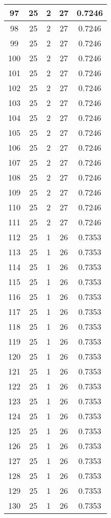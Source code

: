 \documentclass[letterpaper, 12pt]{article}
\begin{document}
\begin{longtable}{|c|c|c|c|c|}
\hline
97 & 25 & 2 & 27 & 0.7246 \\
\hline
98 & 25 & 2 & 27 & 0.7246 \\
\hline
99 & 25 & 2 & 27 & 0.7246 \\
\hline
100 & 25 & 2 & 27 & 0.7246 \\
\hline
101 & 25 & 2 & 27 & 0.7246 \\
\hline
102 & 25 & 2 & 27 & 0.7246 \\
\hline
103 & 25 & 2 & 27 & 0.7246 \\
\hline
104 & 25 & 2 & 27 & 0.7246 \\
\hline
105 & 25 & 2 & 27 & 0.7246 \\
\hline
106 & 25 & 2 & 27 & 0.7246 \\
\hline
107 & 25 & 2 & 27 & 0.7246 \\
\hline
108 & 25 & 2 & 27 & 0.7246 \\
\hline
109 & 25 & 2 & 27 & 0.7246 \\
\hline
110 & 25 & 2 & 27 & 0.7246 \\
\hline
111 & 25 & 2 & 27 & 0.7246 \\
\hline
112 & 25 & 1 & 26 & 0.7353 \\
\hline
113 & 25 & 1 & 26 & 0.7353 \\
\hline
114 & 25 & 1 & 26 & 0.7353 \\
\hline
115 & 25 & 1 & 26 & 0.7353 \\
\hline
116 & 25 & 1 & 26 & 0.7353 \\
\hline
117 & 25 & 1 & 26 & 0.7353 \\
\hline
118 & 25 & 1 & 26 & 0.7353 \\
\hline
119 & 25 & 1 & 26 & 0.7353 \\
\hline
120 & 25 & 1 & 26 & 0.7353 \\
\hline
121 & 25 & 1 & 26 & 0.7353 \\
\hline
122 & 25 & 1 & 26 & 0.7353 \\
\hline
123 & 25 & 1 & 26 & 0.7353 \\
\hline
124 & 25 & 1 & 26 & 0.7353 \\
\hline
125 & 25 & 1 & 26 & 0.7353 \\
\hline
126 & 25 & 1 & 26 & 0.7353 \\
\hline
127 & 25 & 1 & 26 & 0.7353 \\
\hline
128 & 25 & 1 & 26 & 0.7353 \\
\hline
129 & 25 & 1 & 26 & 0.7353 \\
\hline
130 & 25 & 1 & 26 & 0.7353 \\

\end{longtable}
\end{document}
